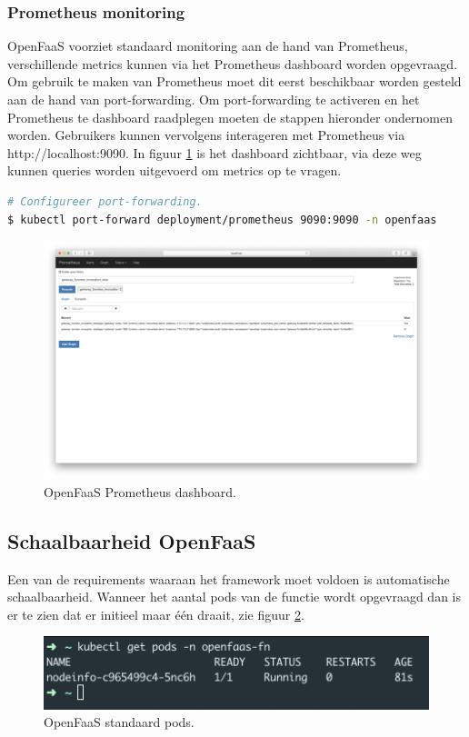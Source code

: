 \subsubsection{Prometheus monitoring}
OpenFaaS voorziet standaard monitoring aan de hand van Prometheus, verschillende metrics kunnen via het Prometheus dashboard worden opgevraagd. Om gebruik te maken van Prometheus moet dit eerst beschikbaar worden gesteld aan de hand van port-forwarding. Om port-forwarding te activeren en het Prometheus te dashboard raadplegen moeten de stappen hieronder ondernomen worden. Gebruikers kunnen  vervolgens interageren met Prometheus via http://localhost:9090. In figuur \ref{fig:openfaas-prometheus} is het dashboard zichtbaar, via deze weg kunnen queries worden uitgevoerd om metrics op te vragen.
\begin{lstlisting}[language=bash]
# Configureer port-forwarding.
$ kubectl port-forward deployment/prometheus 9090:9090 -n openfaas
\end{lstlisting}

\begin{figure}
    \includegraphics[width=1\textwidth]{img/openfaas-prometheus}
    \caption{OpenFaaS Prometheus dashboard.}
    \label{fig:openfaas-prometheus}  
\end{figure}

\subsection{Schaalbaarheid OpenFaaS}
Een van de requirements waaraan het framework moet voldoen is automatische schaalbaarheid. Wanneer het aantal pods van de functie wordt opgevraagd dan is er te zien dat er initieel maar één draait, zie figuur \ref{fig:openfaas-scalability-1}.
\begin{figure}
    \includegraphics[width=1\textwidth]{img/openfaas-scalability-1.png}
    \caption{OpenFaaS standaard pods.}
    \label{fig:openfaas-scalability-1}  
\end{figure}


